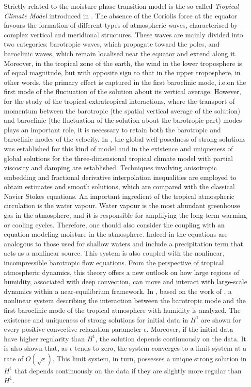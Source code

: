 \documentclass[11pt, a4paper, article,reqno,]{amsart}
\theoremstyle{remark}
\numberwithin{equation}{section}
\begin{document}
Strictly related to the moisture phase transition model is the so called \textit{Tropical Climate Model} introduced in  \cite{FM}. 
The absence of the Coriolis force at the equator favours the formation of different types of atmospheric waves, characterised by complex vertical and meridional structures. These waves are mainly divided into two categories: barotropic waves, which propagate toward the poles, and baroclinic waves, which remain localised near the equator and extend along it.
Moreover, in  the tropical zone of the earth, the wind in the lower troposphere is of equal magnitude, but with opposite sign to that in the upper troposphere, in other words, the primary effect is captured in the first baroclinic mode, i.e.on the first mode of the fluctuation of the solution about its vertical average. However, for the study of the tropical-extratropical interactions, where the transport of momentum between the barotropic (the spatial vertical average of the solution) and baroclinic (the fluctuation of the solution about the barotropic part) modes plays an important role, it is necessary to retain both the barotropic and baroclinic modes of the velocity.  In \cite{LT2}, the  global well-posedness of strong solutions was established for this kind of model and in  \cite{LSL} the existence and uniqueness of global solutions for the three-dimensional tropical climate model with partial viscosity and damping are established. Techniques involving anisotropic embedding and fractional derivative interpolation inequalities are employed to obtain estimates and smooth solutions, which are compared with the classical Navier Stokes equations.  An important ingredient of the tropical atmospheric circulation is the water vapour. Water vapour is the most abundant greenhouse gas in the atmosphere, and it is responsible for amplifying the long-term warming or cooling cycles. Therefore, one should also consider the coupling with an equation modeling moisture in the atmosphere. Indeed in \cite{FM} the equations are analogous to those used for shallow waters and include a precipitation term that acts as a nonlinear source. This system is also coupled with the nonlinear, incompressible barotropic flow equations. From the perspective of tropical atmospheric dynamics, this theory offers a new outlook on how large regions of humidity, associated with deep convection, can move and interact with large-scale dynamics within a near-equilibrium framework. In \cite{LT}, based on the work of \cite{FM}, a nonlinear system describing the interaction between the barotropic mode and the first baroclinic mode of the tropical atmosphere with humidity is analyzed. The existence and uniqueness of strong solutions for initial data in $H^1$ are shown for every positive convective relaxation parameter $\epsilon$. Moreover, if the initial data have higher regularity than $H^1$, the solution depends continuously on the data. It is also shown that, as $\epsilon$ tends to zero, the system converges to a limit system at a rate of $O(\sqrt{\epsilon})$. This limit system, in turn, possesses a unique strong solution in $H^1$ that depends continuously on the data if they are slightly more regular than $H^1$. 
\end{document}
